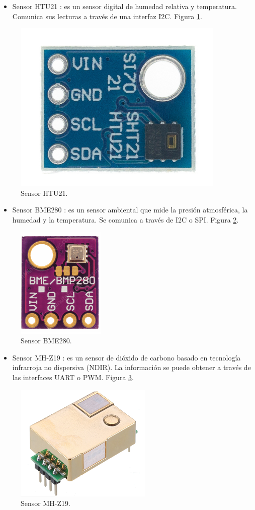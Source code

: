 \begin{itemize}
	\item Sensor HTU21 \citep{sensor_htu21}: es un sensor digital de humedad relativa y temperatura. Comunica sus lecturas a través de una interfaz I2C. Figura \ref{fig:htu21}.
\end{itemize}

\begin{figure}[H]
    \centering
    \includegraphics[width=.2\textwidth]{./Figures/sensor_htu21.png}
    \caption{Sensor HTU21.}
    \label{fig:htu21}
\end{figure}

\begin{itemize}
	\item Sensor BME280 \citep{sensor_bme280}: es un sensor ambiental que mide la presión atmosférica, la humedad y la temperatura. Se comunica a través de I2C o SPI. Figura \ref{fig:bme280}.
\end{itemize}

\begin{figure}[H]
    \centering
    \includegraphics[width=.2\textwidth]{./Figures/sensor_bme280.png}
    \caption{Sensor BME280.}
    \label{fig:bme280}
\end{figure}

\begin{itemize}
	\item Sensor MH-Z19 \citep{sensor_mhz19}: es un sensor de dióxido de carbono basado en tecnología infrarroja no dispersiva (NDIR). La información se puede obtener a través de las interfaces UART o PWM. Figura \ref{fig:mhz19}.
\end{itemize}

\begin{figure}[H]
    \centering
    \includegraphics[width=.3\textwidth]{./Figures/sensor_mhz19.png}
    \caption{Sensor MH-Z19.}
    \label{fig:mhz19}
\end{figure}


